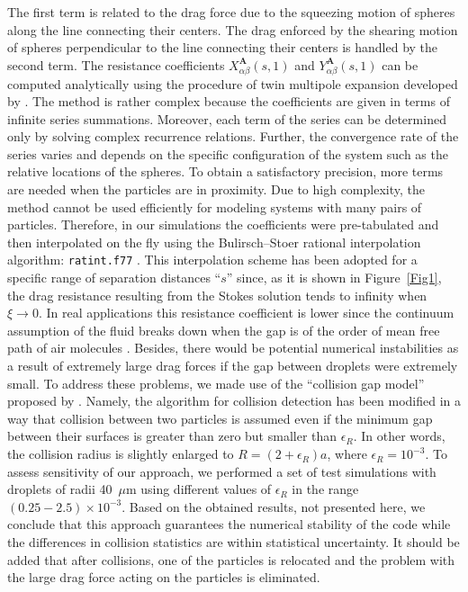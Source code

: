 \documentclass[../thesis.tex]{subfiles}
\begin{document}
The first term is related to the drag force due to the squeezing motion of spheres along the line connecting their centers. The drag enforced by the shearing motion of spheres perpendicular to the line connecting their centers is handled by the second term. The resistance coefficients $X^{\boldsymbol{A}}_{\alpha\beta}(s,1)$ and $Y^{\boldsymbol{A}}_{\alpha\beta}(s,1)$ can be computed analytically using the procedure of twin multipole expansion developed by \cite{JO84}. The method is rather complex because the coefficients are given in terms of infinite series summations. Moreover, each term of the series can be determined only by solving complex recurrence relations. Further, the convergence rate of the series varies and depends on the specific configuration of the system such as the relative locations of the spheres. To obtain a satisfactory precision, more terms are needed when the particles are in proximity. Due to high complexity, the method cannot be used efficiently for modeling systems with many pairs of particles. Therefore, in our simulations the coefficients were pre-tabulated and then interpolated on the fly using the Bulirsch--Stoer rational interpolation algorithm: \texttt{ratint.f77} \citep{PTFV92}. This interpolation scheme has been adopted for a specific range of separation distances ``$s$'' since, as it is shown in Figure~\ref{Fig1}, the drag resistance resulting from the Stokes solution tends to infinity when $\xi \to 0$. In real applications this resistance coefficient is lower since the continuum assumption of the fluid breaks down when the gap is of the order of mean free path of air molecules \citep{SK96}. Besides, there would be potential numerical instabilities as a result of extremely large drag forces if the gap between droplets were extremely small. To address these problems, we made use of the ``collision gap model'' proposed by \citet{HJ70}. Namely, the algorithm for collision detection has been modified in a way that collision between two particles is assumed even if the minimum gap between their surfaces is greater than zero but smaller than $\epsilon_R$. In other words, the collision radius is slightly enlarged to $R=(2+\epsilon_R)a$, where $\epsilon_R=10^{-3}$. To assess sensitivity of our approach, we performed a set of test simulations with droplets of radii 40~$\mu$m using different values of $\epsilon_R$ in the range $(0.25-2.5)\times10^{-3}$. Based on the obtained results, not presented here, we conclude that this approach guarantees the numerical stability of the code while the differences in collision statistics are within statistical uncertainty. It should be added that after collisions, one of the particles is relocated and the problem with the large drag force acting on the particles is eliminated.
\end{document}
